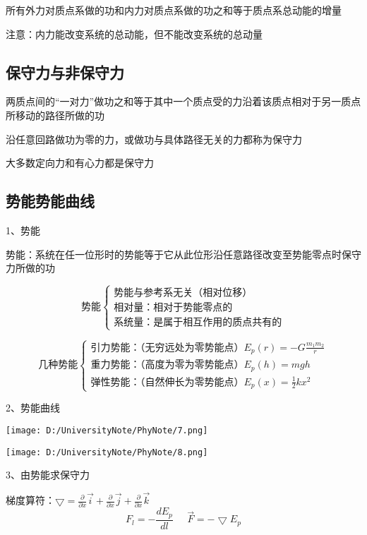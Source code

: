 \documentclass[UTF8]{article}
\begin{document}
    所有外力对质点系做的功和内力对质点系做的功之和等于质点系总动能的增量

    注意：内力能改变系统的总动能，但不能改变系统的总动量

\subsection{保守力与非保守力}

    两质点间的“一对力”做功之和等于其中一个质点受的力沿着该质点相对于另一质点所移动的路径所做的功

    沿任意回路做功为零的力，或做功与具体路径无关的力都称为保守力

    大多数定向力和有心力都是保守力

\subsection{势能\;\;势能曲线}

    1、势能

    势能：系统在任一位形时的势能等于它从此位形沿任意路径改变至势能零点时保守力所做的功

    \[\mbox{势能}\left\{
        \begin{aligned}
        \mbox{势能与参考系无关（相对位移）     } \\
        \mbox{相对量：相对于势能零点的         } \\
        \mbox{系统量：是属于相互作用的质点共有的}
        \end{aligned}
        \right.\]
    
    \[\mbox{几种势能}\left\{
        \begin{aligned}
        \mbox{引力势能：（无穷远处为零势能点）} E_p(r) = -G\frac{m_1m_2}{r}\\
        \mbox{重力势能：（高度为零为零势能点）} E_p(h) = mgh\\
        \mbox{弹性势能：（自然伸长为零势能点）} E_p(x) = \frac{1}{2}kx^2
        \end{aligned}
        \right.\]
    
    2、势能曲线

    \texttt{[image: D:/UniversityNote/PhyNote/7.png]}
    
    \texttt{[image: D:/UniversityNote/PhyNote/8.png]}

    3、由势能求保守力

    梯度算符：$\bigtriangledown = \frac{\partial}{\partial x}\vec{i} + \frac{\partial}{\partial x}\vec{j} + \frac{\partial}{\partial x}\vec{k}$
    \[F_l = -\frac{dE_p}{dl}\;\;\;\;\;\vec{F} = -\bigtriangledown E_p\]
\end{document}
